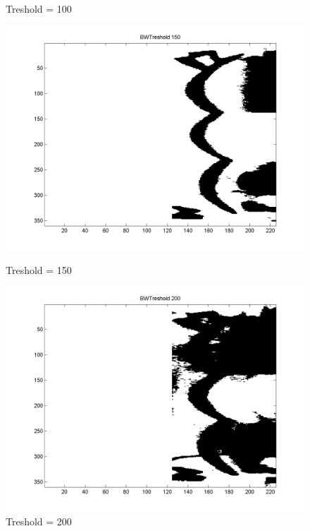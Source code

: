 \documentclass[a4paper]{article}
\begin{document}
\begin{figure}[htbp]
\begin{minipage}[b]{0.5\linewidth}
    \caption{Treshold = 100}
    \label{fig:bw100}
  \end{minipage}
\end{figure}
\begin{figure}[htbp]
  \begin{minipage}[b]{0.5\linewidth}
    \centering
    \includegraphics[width=\linewidth]{img/BWTreshold_150.png}
    \caption{Treshold = 150}
    \label{fig:bw150}
  \end{minipage}
  \hspace{0.5cm}
  \begin{minipage}[b]{0.5\linewidth}
    \centering
    \includegraphics[width=\linewidth]{img/BWTreshold_200.png}
    \caption{Treshold = 200}
    \label{fig:bw200}
  \end{minipage}
\end{figure}
\end{document}
